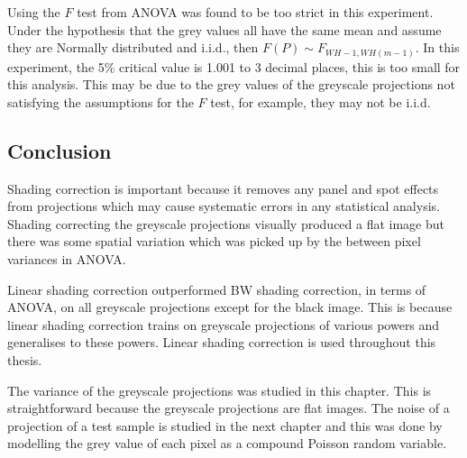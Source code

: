 Using the $F$ test from ANOVA was found to be too strict in this experiment. Under the hypothesis that the grey values all have the same mean and assume they are Normally distributed and i.i.d., then $F(P)\sim F_{WH-1, WH(m-1)}$. In this experiment, the 5\% critical value is 1.001 to 3 decimal places, this is too small for this analysis. This may be due to the grey values of the greyscale projections not satisfying the assumptions for the $F$ test, for example, they may not be i.i.d.

\subsection{Conclusion}

Shading correction is important because it removes any panel and spot effects from projections which may cause systematic errors in any statistical analysis. Shading correcting the greyscale projections visually produced a flat image but there was some spatial variation which was picked up by the between pixel variances in ANOVA.

Linear shading correction outperformed BW shading correction, in terms of ANOVA, on all greyscale projections except for the black image. This is because linear shading correction trains on greyscale projections of various powers and generalises to these powers. Linear shading correction is used throughout this thesis.

The variance of the greyscale projections was studied in this chapter. This is straightforward because the greyscale projections are flat images. The noise of a projection of a test sample is studied in the next chapter and this was done by modelling the grey value of each pixel as a compound Poisson random variable.